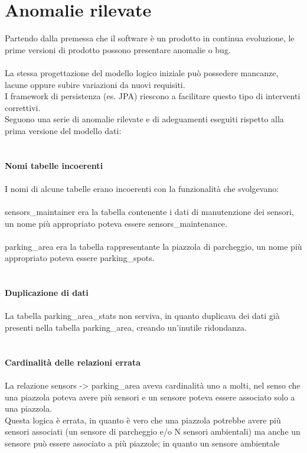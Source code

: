 \section{Anomalie rilevate}
Partendo dalla premessa che il software è un prodotto in continua evoluzione, le prime versioni
di prodotto possono presentare anomalie o bug.
\\\\
La stessa progettazione del modello logico iniziale può possedere mancanze, lacune oppure subire variazioni da nuovi requisiti. 
\\
I framework di persistenza (es. JPA) 
riescono a facilitare questo tipo di interventi correttivi.
\\
Seguono una serie di anomalie rilevate e di adeguamenti eseguiti rispetto alla prima versione del modello dati:
\\\\\\
\textbf{Nomi tabelle incoerenti}
\\\\
I nomi di alcune tabelle erano incoerenti con la funzionalità che svolgevano:
\\\\
sensors\_maintainer era la tabella contenente i dati di manutenzione dei sensori, un 
nome più appropriato poteva essere sensors\_maintenance.
\\\\
parking\_area era la tabella rappresentante la piazzola di parcheggio, un nome più appropriato
poteva essere parking\_spots.
\\\\\\
\textbf{Duplicazione di dati}
\\\\
La tabella parking\_area\_stats non serviva, in quanto duplicava dei dati già presenti
nella tabella parking\_area, creando un'inutile ridondanza.
\\\\\\
\textbf{Cardinalità delle relazioni errata}
\\\\
La relazione sensors -> parking\_area aveva cardinalità uno a molti, nel senso che una piazzola poteva avere
più sensori e un sensore poteva essere associato solo a una piazzola. 
\\
Questa logica è errata, in quanto è vero che una piazzola potrebbe avere più sensori associati (un sensore di parcheggio e/o N
sensori ambientali) ma anche un sensore può essere associato a più piazzole; in quanto un sensore ambientale
